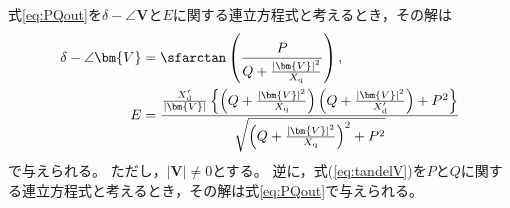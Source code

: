 \documentclass[tombow,dvipdfmx]{corona-a5-1.1}
\begin{document}
\begin{補題}[発電機の内部状態と入出力の関係]\label{lem:delVE}
式\ref{eq:PQout}を$\delta - \angle \bm{V}$と$E$に関する連立方程式と考えるとき，その解は
\begin{subequations}\label{eq:tandelV}
\begin{align}
\delta - \angle \bm{V} & = \sfarctan  \left( \frac{P}{Q + \tfrac{ |\bm{V}|^2}{X_{\rm q}} } \right) , \label{eq:tandelVa} \\
E &=
\frac{ \tfrac{X_{\rm d}'}{|\bm{V}| } \left\{ \left( Q + \tfrac{|\bm{V}|^2}{X_{\rm q}} \right) \left(Q + \tfrac{|\bm{V}|^2}{X_{\rm d}'} \right) +P^2  \right\} }
{  \sqrt{ \left( Q + \tfrac{|\bm{V}|^2}{X_{\rm q}} \right)^2 + P^2 }  }
\label{eq:tandelVb}
\end{align}
\end{subequations}
で与えられる。
ただし，$|\bm{V}|\neq 0$とする。
逆に，式(\ref{eq:tandelV})を$P$と$Q$に関する連立方程式と考えるとき，その解は式\ref{eq:PQout}で与えられる。
\end{補題}
\end{document}
